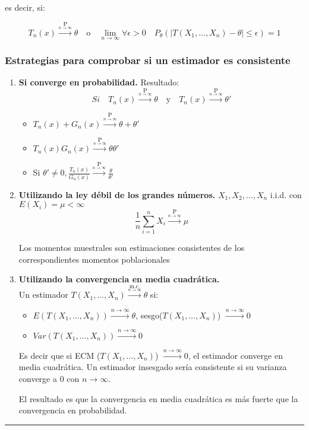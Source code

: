es decir, si:

\[
    T_n(x) \xrightarrow{\underset{n \to \infty}{\text{P}}} \theta \quad \text{o} \quad \lim_{n \to \infty} \forall \epsilon > 0 \quad P_\theta(|T(X_1, \dots, X_n) - \theta| \leq \epsilon) = 1
\]

\newpage
\subsubsection*{Estrategias para comprobar si un estimador es consistente}

\begin{enumerate}
    \item \textbf{Si converge en probabilidad.}
          Resultado:
          \[
              Si \quad T_n(x) \xrightarrow{\underset{n \to \infty}{\text{P}}} \theta \quad \text{y} \quad T_n(x) \xrightarrow{\underset{n \to \infty}{\text{P}}} \theta'
          \]
          \begin{itemize}
              \item $T_n(x)+G_n(x) \xrightarrow{\underset{n \to \infty}{\text{P}}} \theta + \theta '$
              \item $T_n(x)G_n(x) \xrightarrow{\underset{n \to \infty}{\text{P}}} \theta\theta '$
              \item Si $\theta' \neq 0, \frac{T_n(x)}{G_n(x)} \xrightarrow{\underset{n \to \infty}{\text{P}}} \frac{\theta}{\theta '}$
          \end{itemize}

    \item \textbf{Utilizando la ley débil de los grandes números.}
          $X_1, X_2, \dots, X_n$ i.i.d. con $E(X_i)=\mu < \infty$
          \setlength{\parskip}{0em}
          \[\frac{1}{n}\sum_{i=1}^{n} X_i \xrightarrow{\underset{n \to \infty}{\text{P}}} \mu\]

          \setlength{\parskip}{1em}
          Los momentos muestrales son estimaciones consistentes de los correspondientes momentos poblacionales

    \item \textbf{Utilizando la convergencia en media cuadrática.} \\
          Un estimador $T(X_1, \dots, X_n)\xrightarrow{\underset{n \to \infty}{\text{m.c.}}} \theta$ si:
          \begin{itemize}
              \item $E(T(X_1, \dots, X_n)) \xrightarrow{{n \to \infty}} \theta$, sesgo($T(X_1, \dots, X_n)$) $\xrightarrow{{n \to \infty}} 0$
              \item $Var(T(X_1, \dots, X_n)) \xrightarrow{{n \to \infty}} 0$
          \end{itemize}
          Es decir que si ECM ($T(X_1, \dots, X_n)$) $\xrightarrow{{n \to \infty}} 0$, el estimador converge en media cuadrática. Un estimador insesgado sería consistente si su varianza converge a 0 con $n \to \infty$.

          El resultado es que la convergencia en media cuadrática es más fuerte que la convergencia en probabilidad.
\end{enumerate}
\noindent\rule{\textwidth}{0.2pt} %

